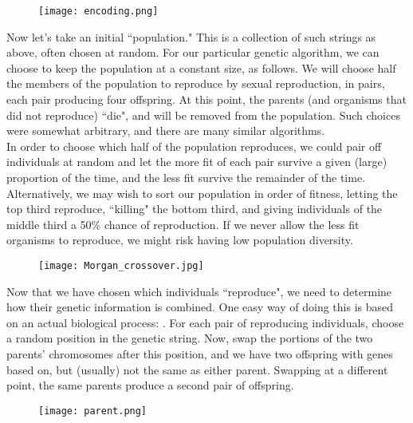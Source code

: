 \begin{figure}[H]
   \centering
   \texttt{[image: encoding.png]} 
\end{figure}

Now let's take an initial ``population." This is a collection of such strings as above, often chosen at random. For our particular genetic algorithm, we can choose to keep the population at a constant size, as follows. We will choose half the members of the population to reproduce by sexual reproduction, in pairs, each pair producing four offspring. At this point, the parents (and organisms that did not reproduce) ``die", and will be removed from the population. Such choices were somewhat arbitrary, and there are many similar algorithms. \\

In order to choose which half of the population reproduces, we could pair off individuals at random and let the more fit of each pair survive a given (large) proportion of the time, and the less fit survive the remainder of the time. Alternatively, we may wish to sort our population in order of fitness, letting the top third reproduce, ``killing" the bottom third, and giving individuals of the middle third a 50\% chance of reproduction. If we never allow the less fit organisms to reproduce, we might risk having low population diversity. \\

\begin{figure}[H]
   \centering
   \texttt{[image: Morgan\_crossover.jpg]} 
\end{figure}

Now that we have chosen which individuals ``reproduce", we need to determine how their genetic information is combined. One easy way of doing this is based on an actual biological process: . For each pair of reproducing individuals, choose a random position in the genetic string. Now, swap the portions of the two parents' chromosomes after this position, and we have two offspring with genes based on, but (usually) not the same as either parent. Swapping at a different point, the same parents produce a second pair of offspring. \\

\begin{figure}[H]
   \centering
   \texttt{[image: parent.png]} 
\end{figure}


